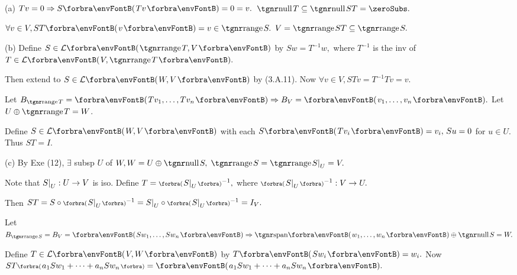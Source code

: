 
\par\quad
(a) $Tv=0\Rightarrow S\Par{Tv}=0=v.$ \Or $\null T\subseteq\null ST=\zeroSubs.$\par\quad\Ha
$\forall v\in V,ST\Par{v}=v\in\range S.$ \;\Or $V=\range ST\subseteq\range S.$\par\vspace{2pt}\quad
(b) Define $S\in\Lm{\range T,V}$ by $Sw=T^{-1}w,$ {where $T^{-1}$ is the inv of $T\in\Lm{V,\range T}.$}\par\quad\Hb
Then extend to $S\in\Lm{W,V}$ by (3.A.11). Now $\forall v\in V,STv=T^{-1}Tv=v.$\par\vspace{3pt}\quad\Hb
\Or {} \;Let $B_{\range T}=\Par{Tv_1,\dots,Tv_n}\Rightarrow B_V=\Par{v_1,\dots,v_n}.$ Let $U\oplus\range T=W$.\par\quad\Hb
Define $S\in\Lm{W,V}$ with each $S\Par{Tv_i}=v_i,\,Su=0$ for $u\in U.$ Thus $ST=I.$\par\vspace{6pt}\quad
(c) By Exe (12), $\exists$ subsp $U$ of $W,W=U\oplus\null S,\;\range S=\range S\mmid_U=V.$\par\quad\Hc
Note that $S\text{\normalsize|}_U:U\rightarrow V$ is iso. Define $T=\BigPar{S\mmid_U}{^{-1}},$ where $\BigPar{S\mmid_U}{^{-1}}:V\rightarrow U.$\par\quad\Hc
Then $ST=S\circ\BigPar{S\mmid_U}{^{-1}}=S\mmid_U\circ\BigPar{S\mmid_U}{^{-1}}=I_V.$\par\vspace{4pt}\quad\Hc
\Or {} \;Let $B_{\range S}=B_{V}=\Par{Sw_1,\dots,Sw_n}\Rightarrow\Span{w_1,\dots,w_n}\oplus\null S=W.$\par\quad\Hc
Define $T\in\Lm{V,W}$ by $T\Par{Sw_i}=w_i.$ Now $ST\BigPar{a_1Sw_1+\dots+a_nSw_n}=\Par{a_1Sw_1+\dots+a_nSw_n}.$\PfEnd
\SepLine\pagebreak

